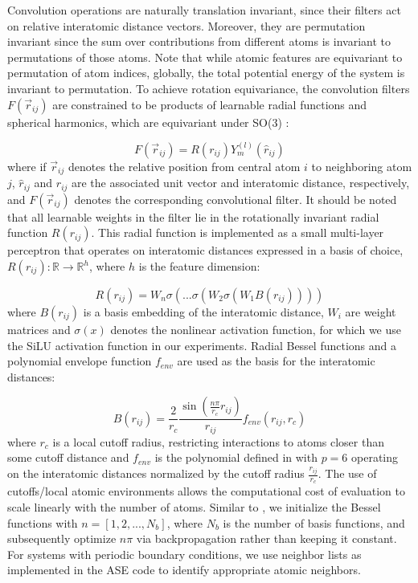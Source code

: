 \documentclass[%
reprint,
superscriptaddress,
nofootinbib,
amsmath,amssymb,
aps,
prl,
]{revtex4-1}
\begin{document}
Convolution operations are naturally translation invariant, since their filters act on relative interatomic distance vectors. Moreover, they are permutation invariant since the sum over contributions from different atoms is invariant to permutations of those atoms. Note that while atomic features are equivariant to permutation of atom indices, globally, the total potential energy of the system is invariant to permutation. To achieve rotation equivariance, the convolution filters $F(\vec{r}_{ij})$ are constrained to be products of learnable radial functions and spherical harmonics, which are equivariant under SO(3) \cite{thomas2018tensor}:
 
\begin{equation}
    F(\vec{r}_{ij}) = R(r_{ij}) Y_m^{(l)}(\hat{r}_{ij})  
\end{equation}
where if $\vec{r}_{ij}$ denotes the relative position from central atom $i$ to neighboring atom $j$, $\hat{r}_{ij}$ and $r_{ij}$ are the associated unit vector and interatomic distance, respectively, and $F(\vec{r}_{ij})$ denotes the corresponding convolutional filter. It should be noted that all learnable weights in the filter lie in the rotationally invariant radial function $R(r_{ij})$. This radial function is implemented as a small multi-layer perceptron that operates on interatomic distances expressed in a basis of choice, $R(r_{ij}): \mathds{R} \rightarrow \mathds{R}^{h}$, where $h$ is the feature dimension: 

\begin{equation}
    R(r_{ij}) = W_n\sigma( ... \sigma(W_2\sigma(W_1 B(r_{ij}))))
\end{equation}
where $B(r_{ij})$ is a basis embedding of the interatomic distance, $W_i$ are weight matrices and $\sigma(x)$ denotes the nonlinear activation function, for which we use the SiLU activation function \cite{hendrycks2016gaussian} in our experiments. Radial Bessel functions and a polynomial envelope function $f_{env}$ \cite{klicpera2020directional} are used as the basis for the interatomic distances: 

\begin{equation}
    B(r_{ij})= \frac{2}{r_c} \frac{\sin(\frac{n\pi}{r_c}r_{ij})}{r_{ij}} f_{env}(r_{ij}, r_c)
\end{equation} 
where $r_c$ is a local cutoff radius, restricting interactions to atoms closer than some cutoff distance and $f_{env}$ is the polynomial defined in \cite{klicpera2020directional} with $p=6$ operating on the interatomic distances normalized by the cutoff radius $\frac{r_{ij}}{r_c}$. The use of cutoffs/local atomic environments allows the computational cost of evaluation to scale linearly with the number of atoms. Similar to \cite{klicpera2020directional}, we initialize the Bessel functions with $n = [1, 2, ..., N_{b}]$, where $N_b$ is the number of basis functions, and subsequently optimize $n \pi$ via backpropagation rather than keeping it constant. For systems with periodic boundary conditions, we use neighbor lists as implemented in the ASE code \cite{Hjorth_Larsen_2017} to identify appropriate atomic neighbors.\\
\end{document}
